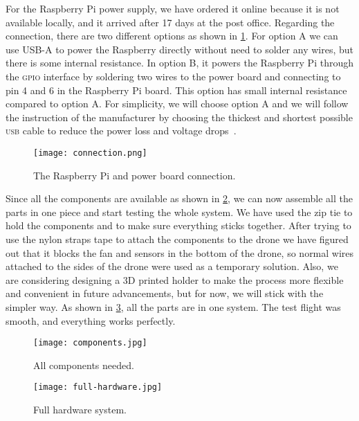 \documentclass[../main.tex]{subfiles}
\begin{document}
For the Raspberry Pi power supply, we have ordered it 
online because it is not available locally, and 
it arrived after 17 days at the post office.
Regarding the connection, there are 
two different options as shown in \cref{fig:connection}.
For option A we can use USB-A to power the Raspberry directly without
need to solder any wires,
but there is some internal resistance.
In option B, it powers the Raspberry Pi through the \textsc{gpio} 
interface by soldering two wires to the power board and 
connecting to pin 4 and 6 in the Raspberry Pi board.
This option has small internal resistance compared to option A.
For simplicity, we will choose option A and we will 
follow the instruction of the manufacturer by choosing 
the thickest and shortest possible \textsc{usb} cable to reduce 
the power loss and voltage drops~\cite{makerfocus}.

 \begin{figure}[p]
 	\centering
 	\texttt{[image: connection.png]}
 	\caption{The Raspberry Pi and power board connection.}
 	\label{fig:connection}
 \end{figure}   

Since all the components are available as shown 
in \cref{fig:components}, we can now assemble 
all the parts in one piece and start testing the whole system.
We have used the zip tie to hold the components and to
make sure everything sticks together. After trying to use the 
nylon straps tape to attach the components to the drone 
we have figured out that it blocks the fan 
and sensors in the bottom of the drone, 
so normal wires attached to the sides of the drone were 
used as a temporary solution. Also, we are considering 
designing a 3D printed holder to make the process more 
flexible and convenient in future advancements, but for now,
we will stick with the simpler way. As shown in 
\cref{fig:full-hardware}, all the parts are in one system. 
The test flight was smooth, and everything works perfectly. 

 \begin{figure}[p]
	\centering
	\texttt{[image: components.jpg]}
	\caption{All components needed.}
	\label{fig:components}
\end{figure}

  \begin{figure}[p]
 	\centering
 	\texttt{[image: full-hardware.jpg]}
 	\caption{Full hardware system.}
 	\label{fig:full-hardware}
 \end{figure}  
\end{document}
